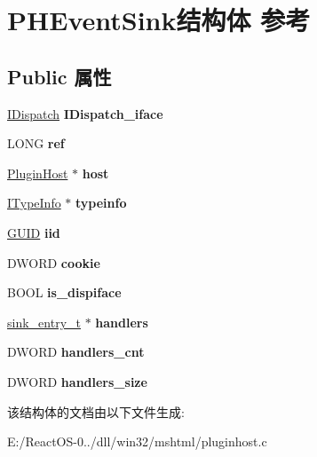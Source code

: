 \hypertarget{struct_p_h_event_sink}{}\section{P\+H\+Event\+Sink结构体 参考}
\label{struct_p_h_event_sink}
\subsection*{Public 属性}
\begin{DoxyCompactItemize}
\item 
\mbox{\label{struct_p_h_event_sink_aa00242b2e88bbceb1864add451e8f6d8}} 
\hyperlink{interface_i_dispatch}{I\+Dispatch} {\bfseries I\+Dispatch\+\_\+iface}
\item 
\mbox{\label{struct_p_h_event_sink_a6301f080b734634666e3a79aec15e94c}} 
L\+O\+NG {\bfseries ref}
\item 
\mbox{\label{struct_p_h_event_sink_ad0b0268fe45104ec4c62eb3ea0b8f576}} 
\hyperlink{struct_plugin_host}{Plugin\+Host} $\ast$ {\bfseries host}
\item 
\mbox{\label{struct_p_h_event_sink_ae2bfba6f10e00c9695f5d910b601ff27}} 
\hyperlink{interface_i_type_info}{I\+Type\+Info} $\ast$ {\bfseries typeinfo}
\item 
\mbox{\label{struct_p_h_event_sink_abeb1e20439a04409656dcc1bfdbc8f2b}} 
\hyperlink{interface_g_u_i_d}{G\+U\+ID} {\bfseries iid}
\item 
\mbox{\label{struct_p_h_event_sink_a74c90d2a5ad11fe65e7c4b2b75d48399}} 
D\+W\+O\+RD {\bfseries cookie}
\item 
\mbox{\label{struct_p_h_event_sink_a30c67083ec1b27963ba75f417514e0f9}} 
B\+O\+OL {\bfseries is\+\_\+dispiface}
\item 
\mbox{\label{struct_p_h_event_sink_adc727df9a4cda00f662d796cc3d3cd0c}} 
\hyperlink{structsink__entry__t}{sink\+\_\+entry\+\_\+t} $\ast$ {\bfseries handlers}
\item 
\mbox{\label{struct_p_h_event_sink_a00e1d4263c3f61cb971a8442115b4f44}} 
D\+W\+O\+RD {\bfseries handlers\+\_\+cnt}
\item 
\mbox{\label{struct_p_h_event_sink_af0e17ed6f589e2d97f02f6e87e28d0da}} 
D\+W\+O\+RD {\bfseries handlers\+\_\+size}
\end{DoxyCompactItemize}


该结构体的文档由以下文件生成\+:\begin{DoxyCompactItemize}
\item 
E\+:/\+React\+O\+S-\/0../dll/win32/mshtml/pluginhost.\+c\end{DoxyCompactItemize}
